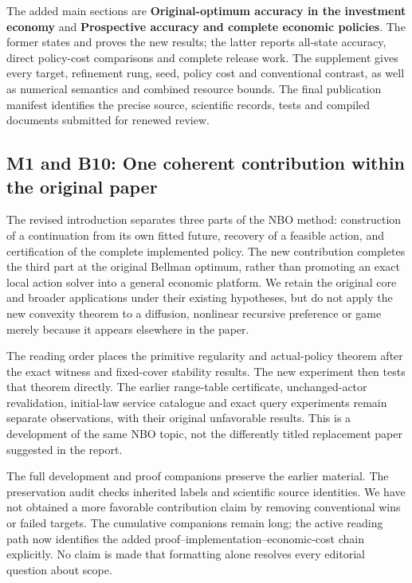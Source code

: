 \documentclass[ecta,nameyear,draft]{econsocart}
\begin{document}
The added main sections are \textbf{Original-optimum accuracy in the
investment economy} and \textbf{Prospective accuracy and complete
economic policies}. The former states and proves the new results; the
latter reports all-state accuracy, direct policy-cost comparisons and
complete release work. The supplement gives every target, refinement
rung, seed, policy cost and conventional contrast, as well as numerical
semantics and combined resource bounds. The final publication manifest
identifies the precise source, scientific records, tests and compiled
documents submitted for renewed review.

\hypertarget{m1-and-b10-one-coherent-contribution-within-the-original-paper}{%
\subsection{M1 and B10: One coherent contribution within the original
paper}\label{m1-and-b10-one-coherent-contribution-within-the-original-paper}}

The revised introduction separates three parts of the NBO method:
construction of a continuation from its own fitted future, recovery of a
feasible action, and certification of the complete implemented policy.
The new contribution completes the third part at the original Bellman
optimum, rather than promoting an exact local action solver into a
general economic platform. We retain the original core and broader
applications under their existing hypotheses, but do not apply the new
convexity theorem to a diffusion, nonlinear recursive preference or game
merely because it appears elsewhere in the paper.

The reading order places the primitive regularity and actual-policy
theorem after the exact witness and fixed-cover stability results. The
new experiment then tests that theorem directly. The earlier range-table
certificate, unchanged-actor revalidation, initial-law service catalogue
and exact query experiments remain separate observations, with their
original unfavorable results. This is a development of the same NBO
topic, not the differently titled replacement paper suggested in the
report.

The full development and proof companions preserve the earlier material.
The preservation audit checks inherited labels and scientific source
identities. We have not obtained a more favorable contribution claim by
removing conventional wins or failed targets. The cumulative companions
remain long; the active reading path now identifies the added
proof--implementation--economic-cost chain explicitly. No claim is made
that formatting alone resolves every editorial question about scope.
\end{document}
